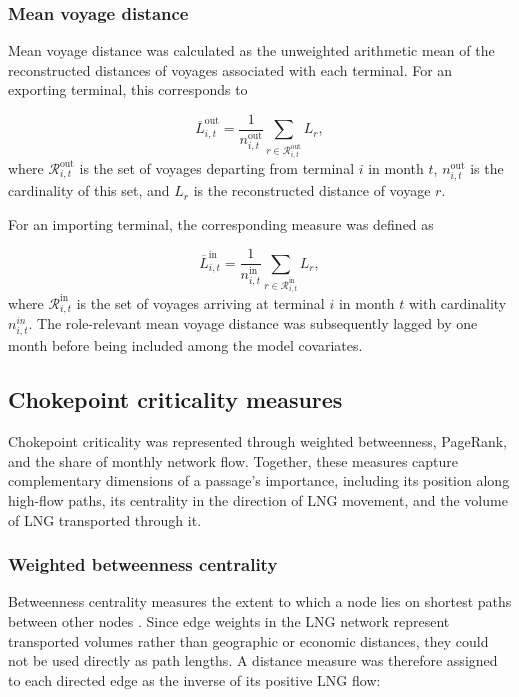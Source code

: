 \documentclass[pdftex,12pt,openright,a4paper,oneside]{book}
\begin{document}
\subsubsection{Mean voyage distance}

Mean voyage distance was calculated as the unweighted arithmetic mean of the reconstructed distances of voyages associated with each terminal. For an exporting terminal, this corresponds to

\begin{equation}
\overline{L}^{\mathrm{out}}_{i,t}
=
\frac{1}{n^{\mathrm{out}}_{i,t}}
\sum_{r\in\mathcal{R}^{\mathrm{out}}_{i,t}} L_r,
\label{eq:outgoing_distance}
\end{equation}
where \(\mathcal{R}^{\mathrm{out}}_{i,t}\) is the set of voyages departing from terminal \(i\) in month \(t\), \(n^{\mathrm{out}}_{i,t}\) is the cardinality of this set, and \(L_r\) is the reconstructed distance of voyage \(r\).

For an importing terminal, the corresponding measure was defined as

\begin{equation}
\overline{L}^{\mathrm{in}}_{i,t}
=
\frac{1}{n^{\mathrm{in}}_{i,t}}
\sum_{r\in\mathcal{R}^{\mathrm{in}}_{i,t}} L_r,
\label{eq:incoming_distance}
\end{equation}
where \(\mathcal{R}^{\mathrm{in}}_{i,t}\) is the set of voyages arriving at terminal \(i\) in month \(t\) with cardinality \(n_{i,t}^{in}\). The role-relevant mean voyage distance was subsequently lagged by one month before being included among the model covariates.

\subsection{Chokepoint criticality measures}
\label{subsec:chokepoint_measures}
Chokepoint criticality was represented through weighted betweenness, PageRank, and the share of monthly network flow. Together, these measures capture complementary dimensions of a passage's importance, including its position along high-flow paths, its centrality in the direction of LNG movement, and the volume of LNG transported through it.

\subsubsection{Weighted betweenness centrality}
Betweenness centrality measures the extent to which a node lies on shortest paths between other nodes \citep{brandes2001}. 
Since edge weights in the LNG network represent transported volumes rather than geographic or economic distances, they could not be used directly as path lengths.
A distance measure was therefore assigned to each directed edge as the inverse of its positive LNG flow:
\end{document}
